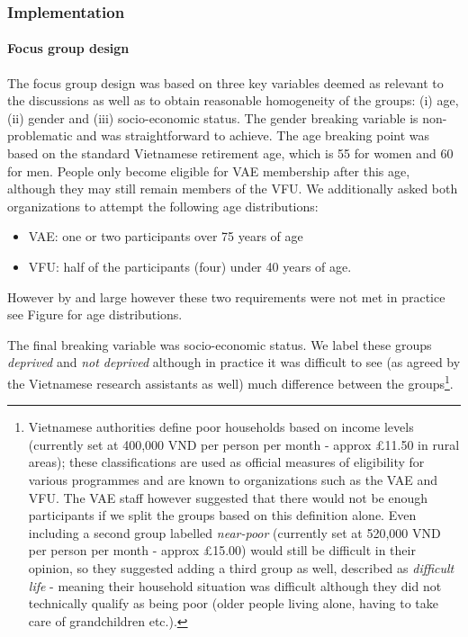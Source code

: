 \documentclass[]{article}
\providecommand{\tightlist}{%
  \setlength{\itemsep}{0pt}\setlength{\parskip}{0pt}}
\let\oldparagraph\paragraph
\renewcommand{\paragraph}[1]{\oldparagraph{#1}\mbox{}}
\let\rmarkdownfootnote\footnote%
\def\footnote{\protect\rmarkdownfootnote}
\begin{document}
\hypertarget{implementation}{%
\subsubsection{Implementation}\label{implementation}}

\hypertarget{focus-group-design}{%
\paragraph{Focus group design}\label{focus-group-design}}

The focus group design was based on three key variables deemed as
relevant to the discussions as well as to obtain reasonable homogeneity
of the groups: (i) age, (ii) gender and (iii) socio-economic status. The
gender breaking variable is non-problematic and was straightforward to
achieve. The age breaking point was based on the standard Vietnamese
retirement age, which is 55 for women and 60 for men. People only become
eligible for VAE membership after this age, although they may still
remain members of the VFU. We additionally asked both organizations to
attempt the following age distributions:

\begin{itemize}
\tightlist
\item
  VAE: one or two participants over 75 years of age
\item
  VFU: half of the participants (four) under 40 years of age.
\end{itemize}

However by and large however these two requirements were not met in
practice see Figure for age distributions.

The final breaking variable was socio-economic status. We label these
groups \emph{deprived} and \emph{not deprived} although in practice it
was difficult to see (as agreed by the Vietnamese research assistants as
well) much difference between the groups\footnote{Vietnamese authorities
  define poor households based on income levels (currently set at
  400,000 VND per person per month - approx £11.50 in rural areas);
  these classifications are used as official measures of eligibility for
  various programmes and are known to organizations such as the VAE and
  VFU. The VAE staff however suggested that there would not be enough
  participants if we split the groups based on this definition alone.
  Even including a second group labelled \emph{near-poor} (currently set
  at 520,000 VND per person per month - approx £15.00) would still be
  difficult in their opinion, so they suggested adding a third group as
  well, described as \emph{difficult life} - meaning their household
  situation was difficult although they did not technically qualify as
  being poor (older people living alone, having to take care of
  grandchildren etc.).}.
\end{document}
